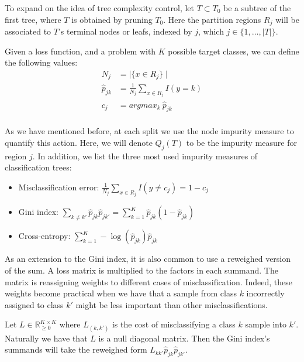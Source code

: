 To expand on the idea of tree complexity control, let $T \subset T_0$ be a subtree of the first tree, where $T$ is obtained by pruning $T_0$. Here the partition regions $R_j$ will be associated to $T$'s terminal nodes or leafs, indexed by $j$, which $j \in \{1,\ldots,|T| \}$.

Given a loss function, and a problem with $K$ possible target classes, we can define the following values:
\begin{equation}
\begin{split}
N_j & = \mid \{x \in R_j \}\mid \\
\hat{p}_{jk} & = \frac{1}{N_j} \sum_{x \in R_j} I(y=k)\\
c_j & = argmax_{k} \ \hat{p}_{jk} \\
\end{split}
\end{equation}\label{eq:decisionTreePruneParameters}

As we have mentioned before, at each split we use the node impurity measure to quantify this action. Here, we will denote $Q_j(T)$ to be the impurity measure for region $j$. In addition, we list the three most used impurity measures of classification trees:

\begin{itemize}
\item Misclassification error: $ \displaystyle \frac{1}{N_j} \sum_{x \in R_j} I(y\neq c_j) = 1 - c_j $
\item Gini index: $ \displaystyle \sum_{k\neq k'} \hat{p}_{jk} \hat{p}_{jk'}  = \sum_{k=1}^{K} \hat{p}_{jk} (1 - \hat{p}_{jk}) $
\item Cross-entropy: $ \displaystyle \sum_{k=1}^{K} -\log(\hat{p}_{jk})\hat{p}_{jk} $
\end{itemize}


As an extension to the Gini index, it is also common to use a reweighed version of the sum.
A loss matrix is multiplied to the factors in each summand.
The matrix is reassigning weights to different cases of misclassification.
Indeed, these weights become practical when we have that a sample from class $k$ incorrectly assigned to class $k'$ might be less important than other misclassifications.

Let $L \in \mathbb R_{\ge 0}^{K \times K}$ where $L_{(k,k')}$ is the cost of misclassifying a class $k$ sample into $k'$.
Naturally we have that $L$ is a null diagonal matrix.
Then the Gini index's summands will take the reweighed form $L_{kk'} \hat{p}_{jk} \hat{p}_{jk'}$.

